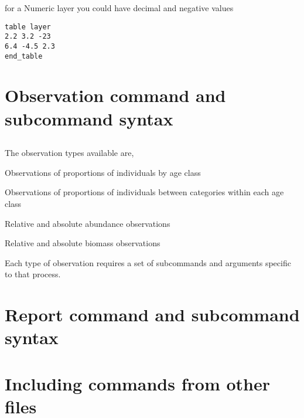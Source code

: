 for a Numeric layer you could have decimal and negative values
{\small{\begin{verbatim}
table layer
2.2 3.2 -23
6.4 -4.5 2.3
end_table
\end{verbatim}}}

\section{Observation command and subcommand syntax\label{sec:observation-syntax}}


\subsection{}

The observation types available are,

\begin{description}
  \item Observations of proportions of individuals by age class
  \item Observations of proportions of individuals between categories within each age class
  \item Relative and absolute abundance observations
  \item Relative and absolute biomass observations
\end{description}

Each type of observation requires a set of subcommands and arguments specific to that process.



\subsection{}


\section{Report command and subcommand syntax\label{sec:report-syntax}}
\subsection{}



\section{Including commands from other files\label{sec:general-syntax}}


